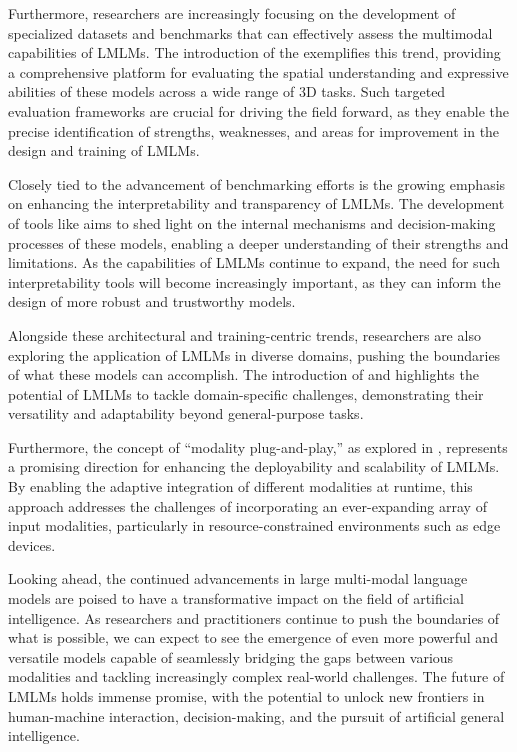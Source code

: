 \documentclass[11pt]{article}
\begin{document}
Furthermore, researchers are increasingly focusing on the development of specialized datasets and benchmarks that can effectively assess the multimodal capabilities of LMLMs. The introduction of the \cite{ref49} exemplifies this trend, providing a comprehensive platform for evaluating the spatial understanding and expressive abilities of these models across a wide range of 3D tasks. Such targeted evaluation frameworks are crucial for driving the field forward, as they enable the precise identification of strengths, weaknesses, and areas for improvement in the design and training of LMLMs.

Closely tied to the advancement of benchmarking efforts is the growing emphasis on enhancing the interpretability and transparency of LMLMs. The development of tools like \cite{ref29} aims to shed light on the internal mechanisms and decision-making processes of these models, enabling a deeper understanding of their strengths and limitations. As the capabilities of LMLMs continue to expand, the need for such interpretability tools will become increasingly important, as they can inform the design of more robust and trustworthy models.

Alongside these architectural and training-centric trends, researchers are also exploring the application of LMLMs in diverse domains, pushing the boundaries of what these models can accomplish. The introduction of \cite{ref349} and \cite{ref350} highlights the potential of LMLMs to tackle domain-specific challenges, demonstrating their versatility and adaptability beyond general-purpose tasks.

Furthermore, the concept of ``modality plug-and-play,'' as explored in \cite{ref340}, represents a promising direction for enhancing the deployability and scalability of LMLMs. By enabling the adaptive integration of different modalities at runtime, this approach addresses the challenges of incorporating an ever-expanding array of input modalities, particularly in resource-constrained environments such as edge devices.

Looking ahead, the continued advancements in large multi-modal language models are poised to have a transformative impact on the field of artificial intelligence. As researchers and practitioners continue to push the boundaries of what is possible, we can expect to see the emergence of even more powerful and versatile models capable of seamlessly bridging the gaps between various modalities and tackling increasingly complex real-world challenges. The future of LMLMs holds immense promise, with the potential to unlock new frontiers in human-machine interaction, decision-making, and the pursuit of artificial general intelligence.
\end{document}
